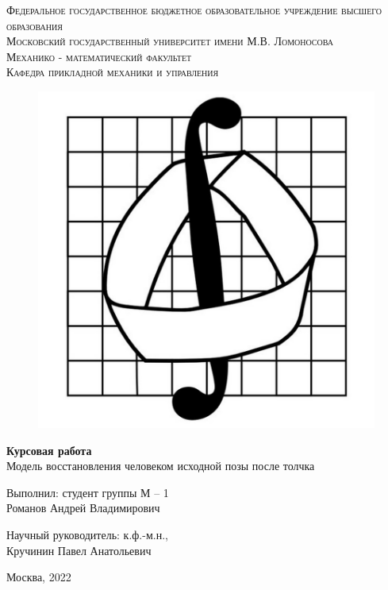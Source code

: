 \documentclass[a4paper,12pt]{article}
\theoremstyle{plain} %
\theoremstyle{definition} %
\theoremstyle{remark} %
\begin{document}
\begin{center}
    \large{\textsc{Федеральное государственное бюджетное образовательное
            учреждение высшего образования
        }}\\
    \large{\textsc{Московский государственный университет имени М.В. Ломоносова
        }} \\
    \vspace{0.2cm}
    \large{\textsc{Механико - математический факультет}}\\
    \vspace{0.2cm}
    \large{\textsc{Кафедра прикладной механики и управления}}\\
    \hfill \break
    \begin{figure}[h!]
        \centering
        \includegraphics[width=0.30\linewidth]{emblema}
        \label{fig:emblema}
    \end{figure}
    \hfill \break
    \hfill \break
    \Large{\textbf{Курсовая работа}\\
        \hfill \break Модель восстановления человеком исходной позы после толчка
    }
\end{center}

\hfill \break
\hfill \break
\hfill \break
\begin{flushright}
    \large{
        Выполнил: студент группы М -- 1 \\ Романов Андрей Владимирович}
\end{flushright}

\begin{flushright}
    \large{
        Научный руководитель: к.ф.-м.н., \\ Кручинин Павел Анатольевич}
\end{flushright}
\hfill \break
\hfill \break
\begin{center} \large{Москва, 2022} \end{center}
\end{document}
